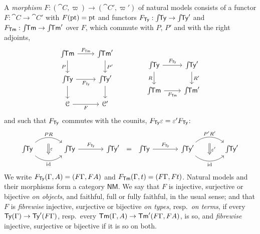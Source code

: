 \begin{definition}\label{def:nm-morphism}
    A \emph{morphism} $F : (\cat{C}, \varpi) \to (\cat{C}', \varpi')$ of natural models consists of a functor $F : \cat{C} \to \cat{C}'$ with $F(\mathrm{pt}) = \mathrm{pt}$ and functors $F_{\mathsf{Ty}} : \int\!\!\mathsf{Ty} \to \int\!\!\mathsf{Ty}'$ and $F_{\mathsf{Tm}} : \int\!\!\mathsf{Tm} \to \int\!\!\mathsf{Tm}'$ over $F$, which commute with $P$, $P'$ and with the right adjoints,
    \[
    \begin{tikzcd}
        \cel{\Tm} \arrow[r, "F_\Tm"] \arrow[d, "P"'] & \cel{\Tm'} \arrow[d, "P'"] \\
        \cel{\Ty} \arrow[r, "F_\Ty"'] \arrow[d] & \cel{\Ty'} \arrow[d] \\
        \cat{C} \arrow[r, "F"'] & \cat{C}'
    \end{tikzcd}
    \qquad\qquad
    \begin{tikzcd}
        \cel{\Ty} \arrow[r, "F_\Ty"] \arrow[d, "R"'] & \cel{\Ty'} \arrow[d, "R'"] \\
        \cel{\Tm} \arrow[r, "F_\Tm"'] & \cel{\Tm'}
    \end{tikzcd}
    \]
    and such that $F_{\mathsf{Ty}}$ commutes with the counits, $F_{\mathsf{Ty}} \varepsilon = \varepsilon' F_{\mathsf{Ty}}$:
    \[
    \begin{tikzcd}[column sep=large]
        \cel{\Ty} \arrow[r, bend left=40, "PR", ""{name=T, below}] \arrow[r, bend right=40, "\id"', ""{name=B, above}] & \cel{\Ty} \arrow[r, "F_\Ty"] & \cel{\Ty'}
        \arrow[Rightarrow, from=T, to=B, "\varepsilon", shorten=1.5mm]
    \end{tikzcd}
    \;=\;
    \begin{tikzcd}[column sep=large]
        \cel{\Ty} \arrow[r, "F_\Ty"] & \cel{\Ty'} \arrow[r, bend left=40, "P'R'", ""{name=T, below}] \arrow[r, bend right=40, "\id"', ""{name=B, above}] & \cel{\Ty'}
        \arrow[Rightarrow, from=T, to=B, "\varepsilon'", shorten=1.5mm]
    \end{tikzcd}
    \]
    We write $F_{\mathsf{Ty}}(\Gamma, A) = (F\Gamma, FA)$ and $F_{\mathsf{Tm}}(\Gamma, t) = (F\Gamma, Ft)$. Natural models and their morphisms form a category $\mathsf{NM}$. We say that $F$ is injective, surjective or bijective \emph{on objects}, and faithful, full or fully faithful, in the usual sense; and that $F$ is \emph{fibrewise} injective, surjective or bijective \emph{on types}, resp.\ \emph{on terms}, if every $\mathsf{Ty}(\Gamma) \to \mathsf{Ty}'(F\Gamma)$, resp.\ every $\mathsf{Tm}(\Gamma, A) \to \mathsf{Tm}'(F\Gamma, FA)$, is so, and \emph{fibrewise} injective, surjective or bijective if it is so on both.
\end{definition}

